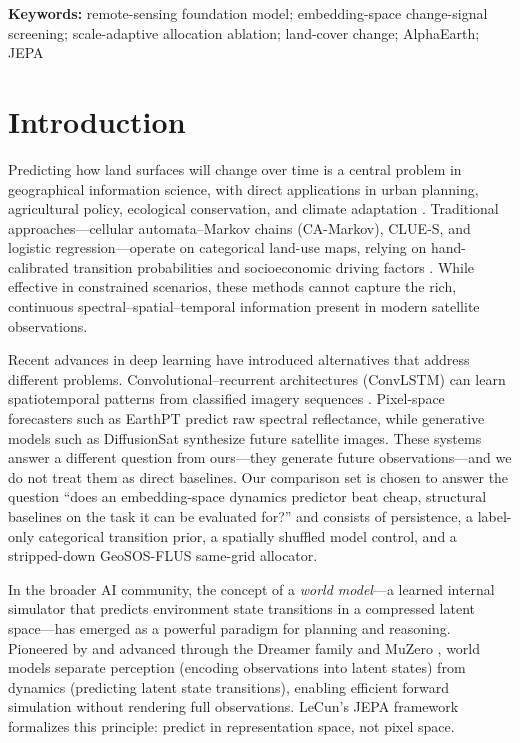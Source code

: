 \documentclass{article}
\newenvironment{keywords}{\par\noindent\textbf{Keywords:} }{\par}%
\begin{document}
\begin{abstract}
tables, paired-inference tests, embeddings, and model checkpoints are released as versioned artefacts.
\end{abstract}

\begin{keywords}
remote-sensing foundation model; embedding-space change-signal screening; scale-adaptive allocation ablation; land-cover change; AlphaEarth; JEPA
\end{keywords}

\section{Introduction}
\label{sec:intro}

Predicting how land surfaces will change over time is a central problem in geographical information science, with direct applications in urban planning, agricultural policy, ecological conservation, and climate adaptation \citep{verburg2004lulc}. Traditional approaches---cellular automata--Markov chains (CA-Markov), CLUE-S, and logistic regression---operate on categorical land-use maps, relying on hand-calibrated transition probabilities and socioeconomic driving factors \citep{veldkamp2004clues}. While effective in constrained scenarios, these methods cannot capture the rich, continuous spectral--spatial--temporal information present in modern satellite observations.

Recent advances in deep learning have introduced alternatives that address different problems. Convolutional--recurrent architectures (ConvLSTM) can learn spatiotemporal patterns from classified imagery sequences \citep{shi2015convlstm}. Pixel-space forecasters such as EarthPT \citep{smith2023earthpt} predict raw spectral reflectance, while generative models such as DiffusionSat \citep{khanna2023diffusionsat} synthesize future satellite images. These systems answer a different question from ours---they generate future observations---and we do not treat them as direct baselines. Our comparison set is chosen to answer the question ``does an embedding-space dynamics predictor beat cheap, structural baselines on the task it can be evaluated for?'' and consists of persistence, a label-only categorical transition prior, a spatially shuffled model control, and a stripped-down GeoSOS-FLUS same-grid allocator.

In the broader AI community, the concept of a \textit{world model}---a learned internal simulator that predicts environment state transitions in a compressed latent space---has emerged as a powerful paradigm for planning and reasoning. Pioneered by \citet{ha2018world} and advanced through the Dreamer family \citep{hafner2023dreamerv3} and MuZero \citep{schrittwieser2020muzero}, world models separate perception (encoding observations into latent states) from dynamics (predicting latent state transitions), enabling efficient forward simulation without rendering full observations. LeCun's JEPA framework \citep{lecun2022jepa} formalizes this principle: predict in representation space, not pixel space.
\end{document}
